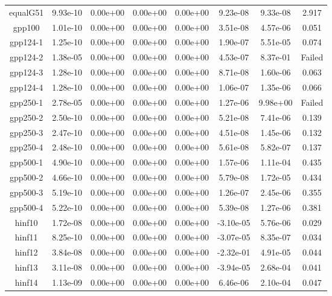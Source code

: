 {{\begin{table}[h]
\begin{center}
{\begin{tabular}{cccccccc}
            equalG51 & 9.93e-10 & 0.00e+00 & 0.00e+00 & 0.00e+00 & 9.23e-08 & 9.33e-08 & 2.917 \\ 
              gpp100 & 1.01e-10 & 0.00e+00 & 0.00e+00 & 0.00e+00 & 3.51e-08 & 4.57e-06 & 0.051 \\ 
            gpp124-1 & 1.25e-10 & 0.00e+00 & 0.00e+00 & 0.00e+00 & 1.90e-07 & 5.51e-05 & 0.074 \\ 
            gpp124-2 & 1.38e-05 & 0.00e+00 & 0.00e+00 & 0.00e+00 & 4.53e-07 & 8.37e-01 & Failed \\ 
            gpp124-3 & 1.28e-10 & 0.00e+00 & 0.00e+00 & 0.00e+00 & 8.71e-08 & 1.60e-06 & 0.063 \\ 
            gpp124-4 & 1.28e-10 & 0.00e+00 & 0.00e+00 & 0.00e+00 & 1.06e-07 & 1.35e-06 & 0.066 \\ 
            gpp250-1 & 2.78e-05 & 0.00e+00 & 0.00e+00 & 0.00e+00 & 1.27e-06 & 9.98e+00 & Failed \\ 
            gpp250-2 & 2.50e-10 & 0.00e+00 & 0.00e+00 & 0.00e+00 & 5.21e-08 & 7.41e-06 & 0.139 \\ 
            gpp250-3 & 2.47e-10 & 0.00e+00 & 0.00e+00 & 0.00e+00 & 4.51e-08 & 1.45e-06 & 0.132 \\ 
            gpp250-4 & 2.48e-10 & 0.00e+00 & 0.00e+00 & 0.00e+00 & 5.61e-08 & 5.82e-07 & 0.137 \\ 
            gpp500-1 & 4.90e-10 & 0.00e+00 & 0.00e+00 & 0.00e+00 & 1.57e-06 & 1.11e-04 & 0.435 \\ 
            gpp500-2 & 4.66e-10 & 0.00e+00 & 0.00e+00 & 0.00e+00 & 5.79e-08 & 1.72e-05 & 0.434 \\ 
            gpp500-3 & 5.19e-10 & 0.00e+00 & 0.00e+00 & 0.00e+00 & 1.26e-07 & 2.45e-06 & 0.355 \\ 
            gpp500-4 & 5.22e-10 & 0.00e+00 & 0.00e+00 & 0.00e+00 & 5.39e-08 & 1.27e-06 & 0.381 \\ 
              hinf10 & 1.72e-08 & 0.00e+00 & 0.00e+00 & 0.00e+00 & -3.10e-05 & 5.76e-06 & 0.029 \\ 
              hinf11 & 8.25e-10 & 0.00e+00 & 0.00e+00 & 0.00e+00 & -3.07e-05 & 8.35e-07 & 0.034 \\ 
              hinf12 & 3.84e-08 & 0.00e+00 & 0.00e+00 & 0.00e+00 & -2.32e-01 & 4.91e-05 & 0.044 \\ 
              hinf13 & 3.11e-08 & 0.00e+00 & 0.00e+00 & 0.00e+00 & -3.94e-05 & 2.68e-04 & 0.041 \\ 
              hinf14 & 1.13e-09 & 0.00e+00 & 0.00e+00 & 0.00e+00 & 6.46e-06 & 2.10e-04 & 0.047 \\ 

\end{tabular}}
\end{center}
\end{table}}}

